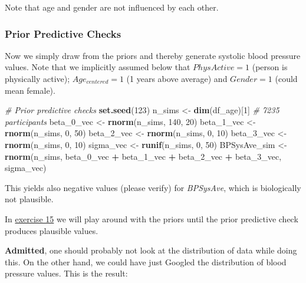 \documentclass[
]{book}
\newenvironment{Shaded}{\begin{snugshade}}{\end{snugshade}}
\newcommand{\CommentTok}[1]{\textcolor[rgb]{0.56,0.35,0.01}{\textit{#1}}}
\newcommand{\DecValTok}[1]{\textcolor[rgb]{0.00,0.00,0.81}{#1}}
\newcommand{\FunctionTok}[1]{\textcolor[rgb]{0.13,0.29,0.53}{\textbf{#1}}}
\newcommand{\NormalTok}[1]{#1}
\newcommand{\OtherTok}[1]{\textcolor[rgb]{0.56,0.35,0.01}{#1}}
\newcommand{\SpecialCharTok}[1]{\textcolor[rgb]{0.81,0.36,0.00}{\textbf{#1}}}
\begin{document}
Note that age and gender are not influenced by each other.

\subsubsection{Prior Predictive Checks}\label{prior_predictive_checks_NHANES}

Now we simply draw from the priors and thereby generate systolic blood pressure values.
Note that we implicitly assumed below that \(PhysActive=1\) (person is physically active);
\(Age_{centered}=1\) (1 years above average) and \(Gender = 1\) (could mean female).

\begin{Shaded}
\begin{Highlighting}[]
\CommentTok{\# Prior predictive checks}
\FunctionTok{set.seed}\NormalTok{(}\DecValTok{123}\NormalTok{)}
\NormalTok{n\_sims }\OtherTok{\textless{}{-}} \FunctionTok{dim}\NormalTok{(df\_age)[}\DecValTok{1}\NormalTok{] }\CommentTok{\# 7235 participants}
\NormalTok{beta\_0\_vec }\OtherTok{\textless{}{-}} \FunctionTok{rnorm}\NormalTok{(n\_sims, }\DecValTok{140}\NormalTok{, }\DecValTok{20}\NormalTok{)}
\NormalTok{beta\_1\_vec }\OtherTok{\textless{}{-}} \FunctionTok{rnorm}\NormalTok{(n\_sims, }\DecValTok{0}\NormalTok{, }\DecValTok{50}\NormalTok{)}
\NormalTok{beta\_2\_vec }\OtherTok{\textless{}{-}} \FunctionTok{rnorm}\NormalTok{(n\_sims, }\DecValTok{0}\NormalTok{, }\DecValTok{10}\NormalTok{)}
\NormalTok{beta\_3\_vec }\OtherTok{\textless{}{-}} \FunctionTok{rnorm}\NormalTok{(n\_sims, }\DecValTok{0}\NormalTok{, }\DecValTok{10}\NormalTok{)}
\NormalTok{sigma\_vec }\OtherTok{\textless{}{-}} \FunctionTok{runif}\NormalTok{(n\_sims, }\DecValTok{0}\NormalTok{, }\DecValTok{50}\NormalTok{)}
\NormalTok{BPSysAve\_sim }\OtherTok{\textless{}{-}} \FunctionTok{rnorm}\NormalTok{(n\_sims, beta\_0\_vec }\SpecialCharTok{+}\NormalTok{ beta\_1\_vec }\SpecialCharTok{+}\NormalTok{ beta\_2\_vec }\SpecialCharTok{+}\NormalTok{ beta\_3\_vec, sigma\_vec)}
\end{Highlighting}
\end{Shaded}

This yields also negative values (please verify) for \emph{BPSysAve}, which is biologically not plausible.

In \hyperref[exercise15_multiple_regression]{exercise 15} we will play around with the priors
until the prior predictive check produces plausible values.

\textbf{Admitted}, one should probably not look at the distribution of data while doing this.
On the other hand, we could have just Googled the distribution of blood pressure values.
This is the result:
\end{document}
